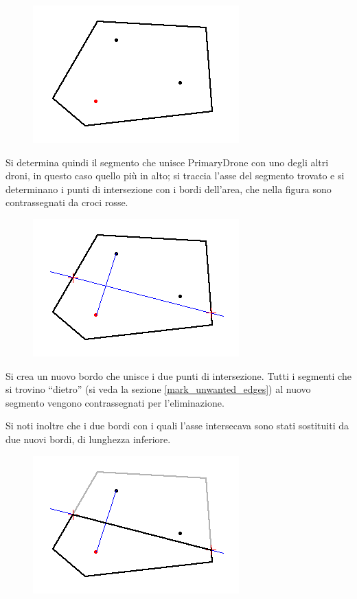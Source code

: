 \documentclass[11pt,a4paper]{report}
\newcommand{\name}[1]{{\ttfamily #1}}
\begin{document}
\begin{figure}[H]
\centering
\includegraphics[scale=0.7]{voronoi1.png}
\end{figure}

Si determina quindi il segmento che unisce \name{PrimaryDrone} con uno degli altri droni, in questo caso quello più in alto; si traccia l'asse del segmento trovato e si determinano i punti di intersezione con i bordi dell'area, che nella figura sono contrassegnati da croci rosse.

\begin{figure}[H]
\centering
\includegraphics[scale=0.7]{voronoi2.png}
\end{figure}

Si crea un nuovo bordo che unisce i due punti di intersezione. Tutti i segmenti che si trovino ``dietro'' (si veda la sezione \ref{mark_unwanted_edges}) al nuovo segmento vengono contrassegnati per l'eliminazione.

Si noti inoltre che i due bordi con i quali l'asse intersecava sono stati sostituiti da due nuovi bordi, di lunghezza inferiore.

\begin{figure}[H]
\centering
\includegraphics[scale=0.7]{voronoi3.png}
\end{figure}
\end{document}
